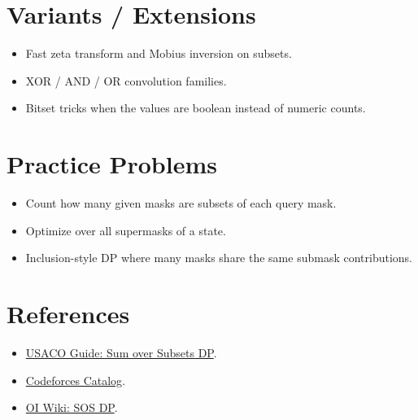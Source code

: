 \section*{Variants / Extensions}

\begin{itemize}
  \item Fast zeta transform and Mobius inversion on subsets.
  \item XOR / AND / OR convolution families.
  \item Bitset tricks when the values are boolean instead of numeric counts.
\end{itemize}

\section*{Practice Problems}

\begin{itemize}
  \item Count how many given masks are subsets of each query mask.
  \item Optimize over all supermasks of a state.
  \item Inclusion-style DP where many masks share the same submask contributions.
\end{itemize}

\section*{References}

\begin{itemize}
  \item \href{https://usaco.guide/plat/dp-sos?lang=py}{USACO Guide: Sum over Subsets DP}.
  \item \href{https://codeforces.com/catalog?locale=en}{Codeforces Catalog}.
  \item \href{https://oi-wiki.org/dp/sos/}{OI Wiki: SOS DP}.
\end{itemize}

